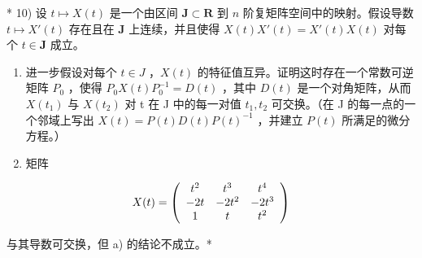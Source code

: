 * 10) 设 \(t \mapsto X(t)\) 是一个由区间 \(\mathbf{J} \subset \mathbf{R}\) 到 \(n\) 阶复矩阵空间中的映射。假设导数 \(t \mapsto X'(t)\) 存在且在 \(\mathbf{J}\) 上连续，并且使得 \(X(t)X'(t) = X'(t)X(t)\) 对每个 \(t \in \mathbf{J}\) 成立。

\begin{enumerate}
\def\labelenumi{\alph{enumi})}
\item
  进一步假设对每个 \(t \in J\) ，\(X(t)\) 的特征值互异。证明这时存在一个常数可逆矩阵 \(P_{0}\) ，使得 \(P_{0}X(t)P_{0}^{-1} = D(t)\) ，其中 \(D(t)\) 是一个对角矩阵，从而 \(X(t_{1})\) 与 \(X(t_{2})\) 对 t 在 J 中的每一对值 \(t_{1}, t_{2}\) 可交换。（在 J 的每一点的一个邻域上写出 \(X(t) = P(t)D(t)P(t)^{-1}\) ，并建立 \(P(t)\) 所满足的微分方程。）
\item
  矩阵
\end{enumerate}

\[
X (t) = \left( \begin{array}{c c c} t ^ {2} & t ^ {3} & t ^ {4} \\ - 2 t & - 2 t ^ {2} & - 2 t ^ {3} \\ 1 & t & t ^ {2} \end{array} \right)
\]

与其导数可交换，但 a) 的结论不成立。*

